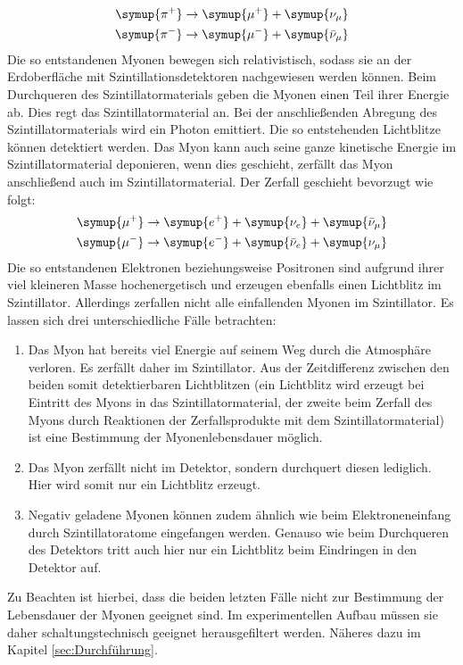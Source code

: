 \begin{align}
  \symup{\pi^+}\to\symup{\mu^+}+\symup{\nu_\mu}\\
  \symup{\pi^-}\to\symup{\mu^-}+\symup{\bar{\nu}_\mu}
\end{align}
Die so entstandenen Myonen bewegen sich relativistisch, sodass sie an der Erdoberfläche mit Szintillationsdetektoren nachgewiesen werden können.
Beim Durchqueren des Szintillatormaterials geben die Myonen einen Teil ihrer Energie ab. Dies regt das Szintillatormaterial an. Bei der anschließenden Abregung des Szintillatormaterials wird ein Photon emittiert.
Die so entstehenden Lichtblitze können detektiert werden.
Das Myon kann auch seine ganze kinetische Energie im Szintillatormaterial deponieren, wenn dies geschieht, zerfällt das Myon anschließend auch im Szintillatormaterial.
Der Zerfall geschieht bevorzugt wie folgt:
\begin{align}
  \symup{\mu^+}\to\symup{e^+}+\symup{\nu_e}+\symup{\bar{\nu}_\mu} \\
  \symup{\mu^-}\to\symup{e^-}+\symup{\bar{\nu}_e}+\symup{\nu_\mu}
\end{align}
Die so entstandenen Elektronen beziehungsweise Positronen sind aufgrund ihrer viel kleineren Masse hochenergetisch und erzeugen ebenfalls einen Lichtblitz im Szintillator.
Allerdings zerfallen nicht alle einfallenden Myonen im Szintillator.
Es lassen sich drei unterschiedliche Fälle betrachten:
\begin{enumerate}
  \item Das Myon hat bereits viel Energie auf seinem Weg durch die Atmosphäre verloren. Es zerfällt daher im Szintillator. Aus der Zeitdifferenz zwischen den beiden somit detektierbaren Lichtblitzen (ein Lichtblitz wird erzeugt bei Eintritt des Myons in das Szintillatormaterial, der zweite beim Zerfall des Myons durch Reaktionen der Zerfallsprodukte mit dem Szintillatormaterial) ist eine Bestimmung der Myonenlebensdauer möglich.
  \item Das Myon zerfällt nicht im Detektor, sondern durchquert diesen lediglich. Hier wird somit nur ein Lichtblitz erzeugt.
  \item Negativ geladene Myonen können zudem ähnlich wie beim Elektroneneinfang durch Szintillatoratome eingefangen werden. Genauso wie beim Durchqueren des Detektors tritt auch hier nur ein Lichtblitz beim Eindringen in den Detektor auf.
\end{enumerate}

Zu Beachten ist hierbei, dass die beiden letzten Fälle nicht zur Bestimmung der Lebensdauer der Myonen geeignet sind. Im experimentellen Aufbau müssen sie daher schaltungstechnisch geeignet herausgefiltert werden. Näheres dazu im Kapitel \ref{sec:Durchführung}.

